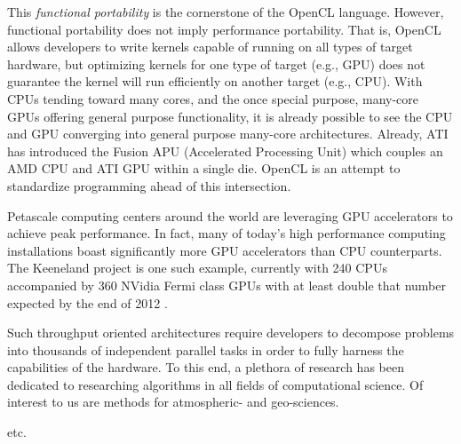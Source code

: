\documentclass{report}
\begin{document}
This \textit{functional portability} is the cornerstone of the OpenCL language. However, functional portability does not imply performance portability. That is, OpenCL allows developers to write kernels capable of running on all types of target hardware, but optimizing kernels for one type of target (e.g., GPU) does not guarantee the kernel will run efficiently on another target (e.g., CPU).
With CPUs tending toward many cores, and the once special purpose, many-core GPUs offering general purpose functionality, it is already possible to see the CPU and GPU converging into general purpose many-core architectures. Already, ATI has introduced the Fusion APU (Accelerated Processing Unit) which couples an AMD CPU and ATI GPU within a single die. OpenCL is an attempt to standardize programming ahead of this intersection. 


Petascale computing centers around the world are leveraging GPU accelerators to achieve peak performance. In fact, many of today's high performance computing installations boast significantly more GPU accelerators than CPU counterparts. The Keeneland project is one such example, currently with 240 CPUs accompanied by 360 NVidia Fermi class GPUs with at least double that number expected by the end of 2012 \cite{Vetter2011}. 

Such throughput oriented architectures require developers to decompose problems into thousands of independent parallel tasks in order to fully harness the capabilities of the hardware. To this end, a plethora of research has been dedicated to researching algorithms in all fields of computational science. Of interest to us are methods for atmospheric- and geo-sciences. 

\cite{Bell2009} 
\cite{Vuduc2005} etc. 
\end{document}
